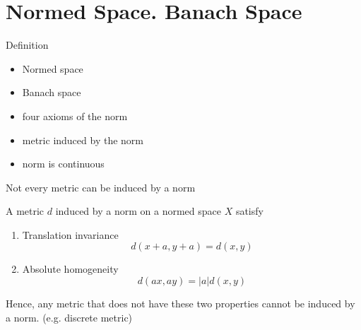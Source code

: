 \section{Normed Space. Banach Space}

\begin{frame}{Definition}
\begin{itemize}
    \item Normed space
    \item Banach space
    \item four axioms of the norm
    \item metric induced by the norm
    \item norm is continuous
\end{itemize}
\end{frame}

\begin{frame}{Not every metric can be induced by a norm}
    \begin{theorem}
        A metric $d$ induced by a norm on a normed space $X$ satisfy
        \begin{enumerate}
            \item Translation invariance 
            $$
            d(x+a, y+a) = d(x,y)
            $$
            \item Absolute homogeneity
            $$
            d(ax,ay) = |a|d(x,y)
            $$
        \end{enumerate}
    \end{theorem}
    Hence, any metric that does not have these two properties cannot be induced by a norm. (e.g. discrete metric)
\end{frame}